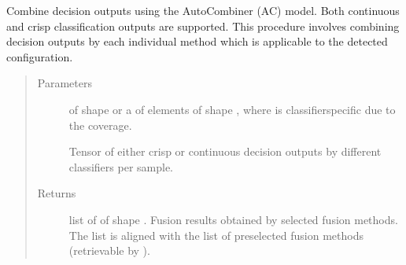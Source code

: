\documentclass[letterpaper,10pt,english]{sphinxmanual}
\begin{document}
\begin{fulllineitems}
\begin{fulllineitems}
\end{fulllineitems}


\begin{fulllineitems}
\label{\detokenize{pusion.auto.generic_combiner:pusion.auto.generic_combiner.GenericCombiner.combine}}
\sphinxAtStartPar
Combine decision outputs using the AutoCombiner (AC) model. Both continuous and crisp classification outputs are
supported. This procedure involves combining decision outputs by each individual method which is applicable
to the detected configuration.
\begin{quote}\begin{description}
\item[{Parameters}] \leavevmode
\sphinxAtStartPar
{} \textendash{} 
\sphinxAtStartPar
{} of shape  or a  of
 elements of shape , where  is classifier\sphinxhyphen{}specific
due to the coverage.

\sphinxAtStartPar
Tensor of either crisp or continuous decision outputs by different classifiers per sample.


\item[{Returns}] \leavevmode
\sphinxAtStartPar
list of  of shape .
Fusion results obtained by selected fusion methods.
The list is aligned with the list of preselected fusion methods (retrievable by ).

\end{description}\end{quote}

\end{fulllineitems}



\end{fulllineitems}
\end{document}

